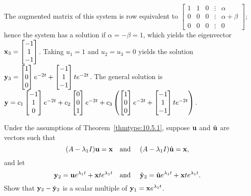 \documentclass{ximera}
\begin{document}
\begin{problem}
\begin{solution}
The augmented matrix of this system is row equivalent to
$  \begin{bmatrix}1&1&0&\vdots&\alpha\\0&0&0&
\vdots&\alpha+\beta\\0&0&0&\vdots&0 \end{bmatrix}$;
hence the system
has a solution if $\alpha=-\beta=1$, which yields the eigenvector
${\bf x}_3= \begin{bmatrix}-1\\1\\-1 \end{bmatrix}$. Taking $u_1=1$  and $u_2=u_3=0$
yields the solution
${\bf y}_3=
 \begin{bmatrix}1\\0\\0 \end{bmatrix}e^{-2t}+ \begin{bmatrix}-1\\1\\-1 \end{bmatrix}te^{-2t}$.
The general solution is
 ${\bf y}= 
c_1 \begin{bmatrix}-1\\1\\0 \end{bmatrix}e^{-2t}+c_2 \begin{bmatrix}0\\0\\1 \end{bmatrix}e^{-2t}+c_3\left
( \begin{bmatrix}1\\0\\0 \end{bmatrix}e^{-2t}+ \begin{bmatrix}-1\\1\\-1 \end{bmatrix}te^{-2t}\right)$.
\end{solution}
 \end{problem}

 \begin{problem}\label{exer:10.5.33}
Under the assumptions of Theorem~\ref{thmtype:10.5.1}, suppose
${\bf u}$ and $\hat{\bf u}$ are vectors such that
$$
(A-\lambda_1I){\bf u}={\bf x}\quad\mbox{and }\quad
(A-\lambda_1I)\hat{\bf u}={\bf x},
$$
and let
$$
{\bf y}_2={\bf u}e^{\lambda_1t}+{\bf x}te^{\lambda_1t}
\quad\mbox{and }\quad
\hat{\bf y}_2=\hat{\bf u}e^{\lambda_1t}+{\bf x}te^{\lambda_1t}.
$$
Show that ${\bf y}_2-\hat{\bf y}_2$ is a scalar multiple of
${\bf y}_1={\bf x}e^{\lambda_1t}$.
 \end{problem}
\end{document}
